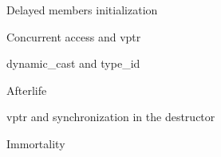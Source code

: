 \documentclass{panicsoftware-presentation}
\begin{document}
\begin{frame}{Delayed members initialization}

\end{frame}

\begin{frame}{Concurrent access and vptr}

\end{frame}

\begin{frame}{dynamic\_cast and type\_id}

\end{frame}

\begin{frame}{Afterlife}

\end{frame}

\begin{frame}{vptr and synchronization in the destructor}

\end{frame}

\begin{frame}{Immortality}

\end{frame}
\end{document}
